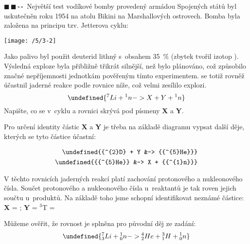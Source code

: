 \documentclass{book}
\let\ch\undefined
\newcommand{\dva}{$\blacksquare \, \blacksquare \, \square \, \square \; \; $}
\renewenvironment{quotation}{\par}{\par} %
\begin{document}
\begin{quotation}
\dva Největší test vodíkové bomby provedený armádou Spojených států byl
uskutečněn roku 1954 na atolu Bikini na Marshallových ostrovech. Bomba
byla založena na principu tzv. Jetterova cyklu: 
\begin{center}
\texttt{[image: /5/3-2]} 
\par\end{center}
Jako palivo byl použit deuterid lithný s~obsahem 35~\% \ch{^{6}Li}
(zbytek tvořil izotop \ch{^{7}Li}). Výsledná exploze byla přibližně třikrát silnější, než bylo plánováno, což způsobilo značné nepříjemnosti jednotkám pověřeným tímto experimentem. \ch{^{7}Li} se totiž rovněž účastnil jaderné reakce podle rovnice níže, což velmi zesílilo
explozi. 
\shorthandoff{-}
\begin{equation*}
\ch{{^{7}Li} + {^{1}n} -> X + Y + {{^{1}n}}}
\end{equation*}
\shorthandon{-}
Napište, co se v~cyklu a rovnici skrývá pod písmeny \textbf{X} a \textbf{Y}.
\end{quotation} \dotfill \par 

Pro určení identity částic \textbf{X} a \textbf{Y} je třeba na základě diagramu vypsat další děje, kterých se tyto částice účastní:

\shorthandoff{-}
\begin{align*}
\ch{{^{2}D} + Y &-> {{^{5}He}}}\\
\ch{{{^{5}He}} &-> X + {{^{1}n}}}
\end{align*} 
\shorthandon{-} 

V těchto rovnicích jaderných reakcí platí zachování protonového a nukleonového čísla. Součet protonového a nukleonového čísla u~reaktantů je tak roven jejich součtu u~produktů. Na základě toho jsme schopní identifikovat neznámé částice: \textbf{X} = \ch{{^{4}He}}; \textbf{Y} = $^3$T = \ch{{^{3}H}}

Můžeme ověřit, že rovnost je splněna pro původní děj ze zadání:
\shorthandoff{-}
\[
\ch{{^{7}_{3}Li} + {^{1}_{0}n} -> {^{4}_{2}He} + {^{3}_{1}H} + {^{1}_{0}n}}
\]
\shorthandon{-} 
\end{document}
